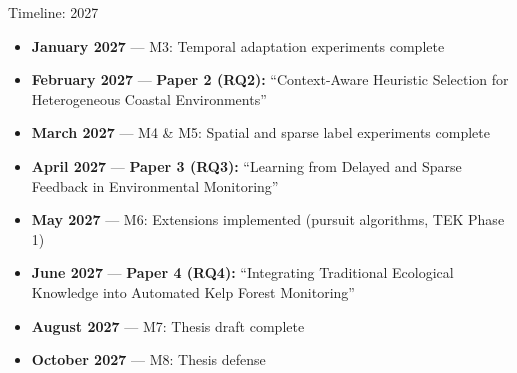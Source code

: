 \documentclass[10pt,xcolor={table,dvipsnames},t]{beamer}
\begin{document}
\begin{frame}{Timeline: 2027}

\begin{itemize}
  \item \textbf{January 2027} --- M3: Temporal adaptation experiments complete

  \item \textbf{February 2027} --- \textbf{Paper 2 (RQ2):} ``Context-Aware Heuristic Selection for Heterogeneous Coastal Environments''

  \item \textbf{March 2027} --- M4 \& M5: Spatial and sparse label experiments complete

  \item \textbf{April 2027} --- \textbf{Paper 3 (RQ3):} ``Learning from Delayed and Sparse Feedback in Environmental Monitoring''

  \item \textbf{May 2027} --- M6: Extensions implemented (pursuit algorithms, TEK Phase 1)

  \item \textbf{June 2027} --- \textbf{Paper 4 (RQ4):} ``Integrating Traditional Ecological Knowledge into Automated Kelp Forest Monitoring''

  \item \textbf{August 2027} --- M7: Thesis draft complete

  \item \textbf{October 2027} --- M8: Thesis defense
\end{itemize}

\end{frame}
\end{document}
